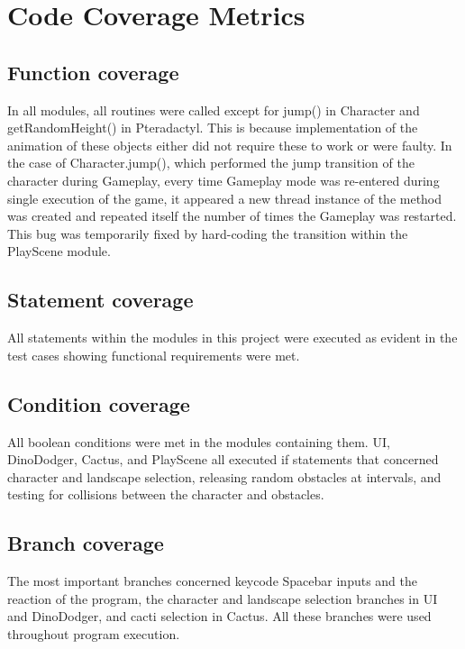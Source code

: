 \documentclass[12pt, titlepage]{article}
\begin{document}
\section{Code Coverage Metrics}
\subsection{Function coverage}
In all modules, all routines were called except for jump() in Character and getRandomHeight() in Pteradactyl. This is because implementation of the animation of these objects either did not require these to work or were faulty. In the case of Character.jump(), which performed the jump transition of the character during Gameplay, every time Gameplay mode was re-entered during single execution of the game, it appeared a new thread instance of the method was created and repeated itself the number of times the Gameplay was restarted. This bug was temporarily fixed by hard-coding the transition within the PlayScene module.
\subsection{Statement coverage}
All statements within the modules in this project were executed as evident in the test cases showing functional requirements were met.
\subsection{Condition coverage}
All boolean conditions were met in the modules containing them. UI, DinoDodger, Cactus, and PlayScene all executed if statements that concerned character and landscape selection, releasing random obstacles at intervals, and testing for collisions between the character and obstacles.
\subsection{Branch coverage}
The most important branches concerned keycode Spacebar inputs and the reaction of the program, the character and landscape selection branches in UI and DinoDodger, and cacti selection in Cactus. All these branches were used throughout program execution.




\end{document}
